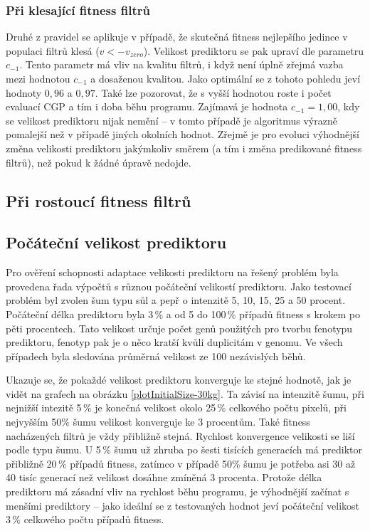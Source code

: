 \subsubsection*{Při klesající fitness filtrů}

Druhé z pravidel se aplikuje v případě, že skutečná fitness nejlepšího jedince v populaci filtrů klesá ($v < -v_\mathit{zero}$). Velikost prediktoru se pak upraví dle parametru $c_{-1}$. Tento parametr má vliv na kvalitu filtrů, i když není úplně zřejmá vazba mezi hodnotou $c_{-1}$ a dosaženou kvalitou. Jako optimální se z tohoto pohledu jeví hodnoty $0,96$ a $0,97$. Také lze pozorovat, že s vyšší hodnotou roste i počet evaluací CGP a tím i doba běhu programu. Zajímavá je hodnota $c_{-1} = 1,00$, kdy se velikost prediktoru nijak nemění -- v tomto případě je algoritmus výrazně pomalejší než v případě jiných okolních hodnot. Zřejmě je pro evoluci výhodnější změna velikosti prediktoru jakýmkoliv směrem (a tím i změna predikované fitness filtrů), než pokud k žádné úpravě nedojde.

\subsection*{Při rostoucí fitness filtrů}

\subsection{Počáteční velikost prediktoru}



Pro ověření schopnosti adaptace velikosti prediktoru na řešený problém byla provedena řada výpočtů s různou počáteční velikostí prediktoru. Jako testovací problém byl zvolen šum typu sůl a pepř o intenzitě 5, 10, 15, 25 a 50 procent. Počáteční délka prediktoru byla 3\,\% a od 5 do 100\,\% případů fitness s krokem po pěti procentech. Tato velikost určuje počet genů použitých pro tvorbu fenotypu prediktoru, fenotyp pak je o něco kratší kvůli duplicitám v genomu. Ve všech případech byla sledována průměrná velikost ze 100 nezávislých běhů.

Ukazuje se, že pokaždé velikost prediktoru konverguje ke stejné hodnotě, jak je vidět na grafech na obrázku \ref{plotInitialSize-30kg}. Ta závisí na intenzitě šumu, při nejnižší intezitě 5\,\% je konečná velikost okolo 25\,\% celkového počtu pixelů, při nejvyšším 50\% šumu velikost konverguje ke 3 procentům. Také fitness nacházených filtrů je vždy přibližně stejná. Rychlost konvergence velikosti se liší podle typu šumu. U 5\,\% šumu už zhruba po šesti tisících generacích má prediktor přibližně 20\,\% případů fitness, zatímco v případě 50\% šumu je potřeba asi 30 až 40 tisíc generací než velikost dosáhne zmíněná 3 procenta. Protože délka prediktoru má zásadní vliv na rychlost běhu programu, je výhodnější začínat s menšími prediktory -- jako ideální se z testovaných hodnot jeví počáteční velikost 3\,\% celkového počtu případů fitness.

